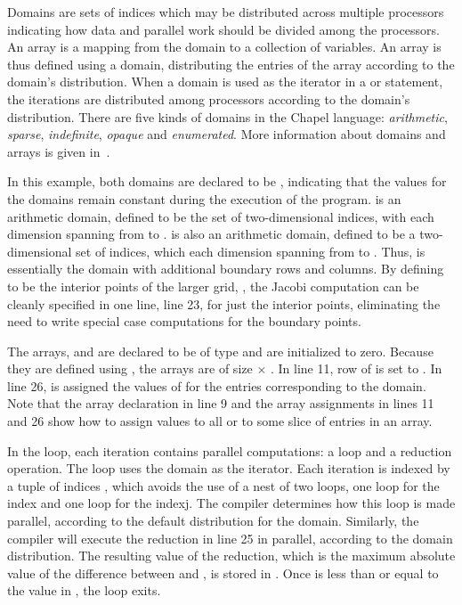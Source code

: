 Domains are sets of indices which may be distributed
across multiple processors indicating how data and parallel work should
be divided among the processors.  An array is a mapping from the domain
to a collection of variables.  An array is thus defined using a domain, distributing
the entries of the array according to the domain's distribution.
When a domain is used as the iterator in a  or 
 statement, the iterations are distributed among processors
according to the domain's distribution.  There are five kinds of domains in
the Chapel language:  {\em arithmetic}, {\em sparse}, {\em indefinite}, 
{\em opaque} and {\em enumerated}.  More information about domains and
arrays is given in~. 

In this example, both domains are declared to be , indicating
that the values for the domains remain constant during the execution of
the program.  
 is an arithmetic domain, defined to be the set 
of two-dimensional indices, with each dimension spanning from  to .  
 is also an arithmetic domain, defined to be a two-dimensional 
set of indices, which each dimension spanning from  to .  Thus, 
 is essentially the  domain with additional 
boundary rows and columns.  By defining  to be the interior
points of the larger grid, , the Jacobi computation can be cleanly 
specified in one line, line 23, for just the interior points, 
eliminating the need to write special case computations for the boundary points.

The arrays,  and  are declared to be of type  and
are initialized to zero.  Because they are defined using , the
arrays are of size  $\times$ . In line 11, row 
of  is set to .  In line 26,  is assigned the values
of  for the entries corresponding to the  domain.
Note that the array declaration in line 9 and
the array assignments in lines 11 and 26 show how to assign values to all or to
some slice of entries in an array.

In the  loop, each iteration contains parallel computations:
a  loop and a  reduction operation.  The 
loop uses the  domain as the iterator.  Each iteration
is indexed by a tuple of indices , which avoids the use of
a nest of two loops, one loop for the index  and one loop for the
index{j}.  The compiler determines how this loop is made parallel, according
to the default distribution for the  domain.   Similarly,
the compiler will execute the reduction in line 25 in parallel, according
to the  domain distribution.  The resulting value of
the reduction, which is the maximum absolute value of the difference between
 and , is stored in .  Once  is
less than or equal to the value in , the  loop 
exits.

